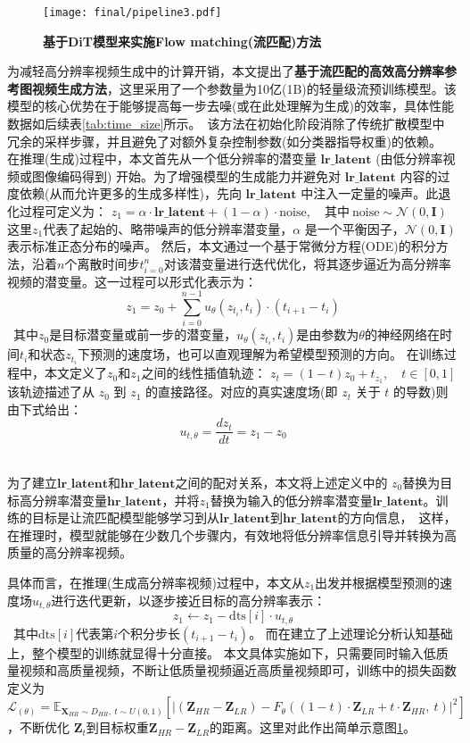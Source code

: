 \begin{figure}[htbp]
    \centering
    \texttt{[image: final/pipeline3.pdf]}
    \caption{\textbf{基于DiT模型来实施Flow matching(流匹配)方法}
    }
    \label{fig:Flow matching}
\end{figure}

为减轻高分辨率视频生成中的计算开销，本文提出了\textbf{基于流匹配的高效高分辨率参考图视频生成方法}，这里采用了一个参数量为10亿(1B)的轻量级流预训练模型。该模型的核心优势在于能够提高每一步去噪(或在此处理解为生成)的效率，具体性能数据如后续表\ref{tab:time_size}所示。\
该方法在初始化阶段消除了传统扩散模型中冗余的采样步骤，并且避免了对额外复杂控制参数(如分类器指导权重)的依赖。
在推理(生成)过程中，本文首先从一个低分辨率的潜变量 $\mathbf{lr\_latent}$ (由低分辨率视频或图像编码得到) 开始。为了增强模型的生成能力并避免对 $\mathbf{lr\_latent}$ 内容的过度依赖(从而允许更多的生成多样性)，先向 $\mathbf{lr\_latent}$ 中注入一定量的噪声。此退化过程可定义为：
$z_1 = \alpha \cdot \mathbf{lr\_latent} + (1 - \alpha) \cdot \text{noise}, \quad \text{其中} \ \text{noise} \sim \mathcal{N}(0, \mathbf{I})$
这里$z_1$代表了起始的、略带噪声的低分辨率潜变量，$\alpha$ 是一个平衡因子，$\mathcal{N}(0, \mathbf{I})$ 表示标准正态分布的噪声。
然后，本文通过一个基于常微分方程(ODE)的积分方法，沿着$n$个离散时间步$t_{i=0}^n$对该潜变量进行迭代优化，将其逐步逼近为高分辨率视频的潜变量。这一过程可以形式化表示为：
\[\
z_1 = z_0 + \sum_{i=0}^{n-1} u_\theta(z_{t_i}, t_i) \cdot (t_{i+1} - t_i)
\]\
其中$z_0$是目标潜变量或前一步的潜变量，$u_\theta(z_{t_i}, t_i)$是由参数为$\theta$的神经网络在时间$t_i$和状态$z_{t_i}$下预测的速度场，也可以直观理解为希望模型预测的方向。
在训练过程中，本文定义了$z_0$和$z_1$之间的线性插值轨迹：
$z_t = (1 - t) z_0 + t_{z_1}, \quad t \in [0,1]$
该轨迹描述了从 $z_0$ 到 $z_1$ 的直接路径。对应的真实速度场(即 $z_t$ 关于 $t$ 的导数)则由下式给出：\[\ 
u_{t,\theta} = \frac{dz_t}{dt} = z_1 - z_0
\]\

为了建立$\mathbf{lr\_latent}$和$\mathbf{hr\_latent}$之间的配对关系，本文将上述定义中的 $z_0$替换为目标高分辨率潜变量$\mathbf{hr\_latent}$，并将$z_1$替换为输入的低分辨率潜变量$\mathbf{lr\_latent}$。训练的目标是让流匹配模型能够学习到从$\mathbf{lr\_latent}$到$\mathbf{hr\_latent}$的方向信息，\
这样，在推理时，模型就能够在少数几个步骤内，有效地将低分辨率信息引导并转换为高质量的高分辨率视频。


具体而言，在推理(生成高分辨率视频)过程中，本文从$z_1$出发并根据模型预测的速度场$u_{t,\theta}$进行迭代更新，以逐步接近目标的高分辨率表示：
\[\ 
z_1 \leftarrow z_1 - \text{dts}[i] \cdot u_{t,\theta}
\]\, 其中$\text{dts}[i]$代表第$i$个积分步长$(t_{i+1} - t_{i})$。
而在建立了上述理论分析认知基础上，整个模型的训练就显得十分直接。
本文具体实施如下，只需要同时输入低质量视频和高质量视频，不断让低质量视频逼近高质量视频即可，训练中的损失函数定义为$$\mathcal{L}_(\theta) = \mathbb{E}_{\mathbf{X}_{HR} \sim D_{HR},\ t \sim U(0,1)} \left[ \left| \left( \mathbf{Z}_{HR} - \mathbf{Z}_{LR} \right) - F_\theta\left( (1 - t) \cdot \mathbf{Z}_{LR} + t \cdot \mathbf{Z}_{HR},\ t \right) \right|^2 \right]$$，不断优化 $\mathbf{Z}_t$到目标权重$\mathbf{Z}_{HR} - \mathbf{Z}_{LR}$的距离。这里对此作出简单示意图\ref{fig:Flow matching}。

